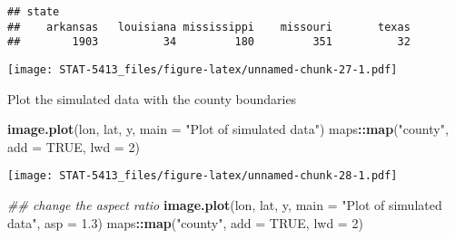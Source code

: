 \documentclass[]{book}
\newenvironment{Shaded}{\begin{snugshade}}{\end{snugshade}}
\newcommand{\CommentTok}[1]{\textcolor[rgb]{0.56,0.35,0.01}{\textit{#1}}}
\newcommand{\DataTypeTok}[1]{\textcolor[rgb]{0.13,0.29,0.53}{#1}}
\newcommand{\DecValTok}[1]{\textcolor[rgb]{0.00,0.00,0.81}{#1}}
\newcommand{\FloatTok}[1]{\textcolor[rgb]{0.00,0.00,0.81}{#1}}
\newcommand{\KeywordTok}[1]{\textcolor[rgb]{0.13,0.29,0.53}{\textbf{#1}}}
\newcommand{\NormalTok}[1]{#1}
\newcommand{\OperatorTok}[1]{\textcolor[rgb]{0.81,0.36,0.00}{\textbf{#1}}}
\newcommand{\OtherTok}[1]{\textcolor[rgb]{0.56,0.35,0.01}{#1}}
\newcommand{\StringTok}[1]{\textcolor[rgb]{0.31,0.60,0.02}{#1}}
\begin{document}
\begin{verbatim}
## state
##    arkansas   louisiana mississippi    missouri       texas 
##        1903          34         180         351          32
\end{verbatim}

\begin{Shaded}
\end{Shaded}

\texttt{[image: STAT-5413\_files/figure-latex/unnamed-chunk-27-1.pdf]}

Plot the simulated data with the county boundaries

\begin{Shaded}
\begin{Highlighting}[]
\KeywordTok{image.plot}\NormalTok{(lon, lat, y, }\DataTypeTok{main =} \StringTok{"Plot of simulated data"}\NormalTok{)}
\NormalTok{maps}\OperatorTok{::}\KeywordTok{map}\NormalTok{(}\StringTok{"county"}\NormalTok{, }\DataTypeTok{add =} \OtherTok{TRUE}\NormalTok{, }\DataTypeTok{lwd =} \DecValTok{2}\NormalTok{)}
\end{Highlighting}
\end{Shaded}

\texttt{[image: STAT-5413\_files/figure-latex/unnamed-chunk-28-1.pdf]}

\begin{Shaded}
\begin{Highlighting}[]
\CommentTok{## change the aspect ratio}
\KeywordTok{image.plot}\NormalTok{(lon, lat, y, }\DataTypeTok{main =} \StringTok{"Plot of simulated data"}\NormalTok{, }\DataTypeTok{asp =} \FloatTok{1.3}\NormalTok{)}
\NormalTok{maps}\OperatorTok{::}\KeywordTok{map}\NormalTok{(}\StringTok{"county"}\NormalTok{, }\DataTypeTok{add =} \OtherTok{TRUE}\NormalTok{, }\DataTypeTok{lwd =} \DecValTok{2}\NormalTok{)}
\end{Highlighting}
\end{Shaded}
\end{document}
